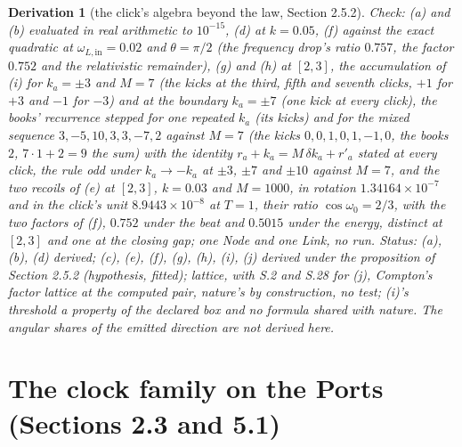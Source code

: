 \documentclass[pdflatex,sn-mathphys-num]{sn-jnl}
\theoremstyle{thmstyleone}
\newtheorem{derivation}{Derivation}
\begin{document}
\begin{derivation}[the click's algebra beyond the law, Section 2.5.2]
\emph{Check:} (a) and (b) evaluated in real arithmetic to $10^{-15}$, (d) at $k = 0.05$, (f) against the exact quadratic at $\omega_{L,\mathrm{in}} = 0.02$ and $\theta = \pi / 2$ (the frequency drop's ratio $0.757$, the factor $0.752$ and the relativistic remainder), (g) and (h) at $[2, 3]$, the accumulation of (i) for $k_a = \pm 3$ and $M = 7$ (the kicks at the third, fifth and seventh clicks, $+1$ for $+3$ and $-1$ for $-3$) and at the boundary $k_a = \pm 7$ (one kick at every click), the books' recurrence stepped for one repeated $k_a$ (its kicks) and for the mixed sequence $3, -5, 10, 3, 3, -7, 2$ against $M = 7$ (the kicks $0, 0, 1, 0, 1, -1, 0$, the books $2$, $7 \cdot 1 + 2 = 9$ the sum) with the identity $r_a + k_a = M\,\delta k_a + r'_a$ stated at every click, the rule odd under $k_a \to -k_a$ at $\pm 3$, $\pm 7$ and $\pm 10$ against $M = 7$, and the two recoils of (e) at $[2, 3]$, $k = 0.03$ and $M = 1000$, in rotation $1.34164 \times 10^{-7}$ and in the click's unit $8.9443 \times 10^{-8}$ at $T = 1$, their ratio $\cos\omega_0 = 2 / 3$, with the two factors of (f), $0.752$ under the beat and $0.5015$ under the energy, distinct at $[2, 3]$ and one at the closing gap; one Node and one Link, no run.
\emph{Status:} (a), (b), (d) derived; (c), (e), (f), (g), (h), (i), (j) derived under the proposition of Section 2.5.2 (hypothesis, fitted); lattice, with S.2 and S.28 for (j), Compton's factor lattice at the computed pair, nature's by construction, no test; (i)'s threshold a property of the declared box and no formula shared with nature. The angular shares of the emitted direction are not derived here.
\end{derivation}

\section*{The clock family on the Ports (Sections 2.3 and 5.1)}
\end{document}
